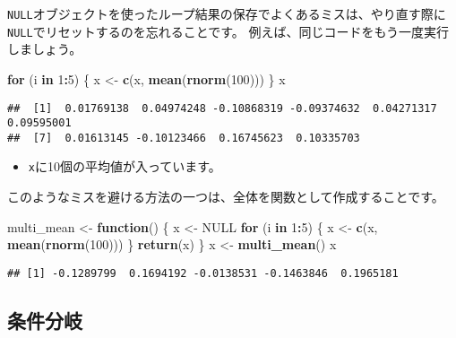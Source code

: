 \documentclass[]{bxjsarticle}
\newenvironment{Shaded}{\begin{snugshade}}{\end{snugshade}}
\newcommand{\ControlFlowTok}[1]{\textcolor[rgb]{0.13,0.29,0.53}{\textbf{#1}}}
\newcommand{\DecValTok}[1]{\textcolor[rgb]{0.00,0.00,0.81}{#1}}
\newcommand{\KeywordTok}[1]{\textcolor[rgb]{0.13,0.29,0.53}{\textbf{#1}}}
\newcommand{\NormalTok}[1]{#1}
\newcommand{\OperatorTok}[1]{\textcolor[rgb]{0.81,0.36,0.00}{\textbf{#1}}}
\newcommand{\OtherTok}[1]{\textcolor[rgb]{0.56,0.35,0.01}{#1}}
\newcommand{\StringTok}[1]{\textcolor[rgb]{0.31,0.60,0.02}{#1}}
\providecommand{\tightlist}{%
  \setlength{\itemsep}{0pt}\setlength{\parskip}{0pt}}
\begin{document}
\texttt{NULL}オブジェクトを使ったループ結果の保存でよくあるミスは、やり直す際に\texttt{NULL}でリセットするのを忘れることです。
例えば、同じコードをもう一度実行しましょう。

\begin{Shaded}
\begin{Highlighting}[]
\ControlFlowTok{for}\NormalTok{ (i }\ControlFlowTok{in} \DecValTok{1}\OperatorTok{:}\DecValTok{5}\NormalTok{) \{}
\NormalTok{  x <-}\StringTok{ }\KeywordTok{c}\NormalTok{(x, }\KeywordTok{mean}\NormalTok{(}\KeywordTok{rnorm}\NormalTok{(}\DecValTok{100}\NormalTok{)))}
\NormalTok{\}}
\NormalTok{x}
\end{Highlighting}
\end{Shaded}

\begin{verbatim}
##  [1]  0.01769138  0.04974248 -0.10868319 -0.09374632  0.04271317  0.09595001
##  [7]  0.01613145 -0.10123466  0.16745623  0.10335703
\end{verbatim}

\begin{itemize}
\tightlist
\item
  \texttt{x}に10個の平均値が入っています。
\end{itemize}

このようなミスを避ける方法の一つは、全体を関数として作成することです。

\begin{Shaded}
\begin{Highlighting}[]
\NormalTok{multi_mean <-}\StringTok{ }\ControlFlowTok{function}\NormalTok{() \{}
\NormalTok{  x <-}\StringTok{ }\OtherTok{NULL}
  \ControlFlowTok{for}\NormalTok{ (i }\ControlFlowTok{in} \DecValTok{1}\OperatorTok{:}\DecValTok{5}\NormalTok{) \{}
\NormalTok{    x <-}\StringTok{ }\KeywordTok{c}\NormalTok{(x, }\KeywordTok{mean}\NormalTok{(}\KeywordTok{rnorm}\NormalTok{(}\DecValTok{100}\NormalTok{)))}
\NormalTok{  \}}
  \KeywordTok{return}\NormalTok{(x)}
\NormalTok{\}}
\NormalTok{x <-}\StringTok{ }\KeywordTok{multi_mean}\NormalTok{()}
\NormalTok{x}
\end{Highlighting}
\end{Shaded}

\begin{verbatim}
## [1] -0.1289799  0.1694192 -0.0138531 -0.1463846  0.1965181
\end{verbatim}

\hypertarget{ux6761ux4ef6ux5206ux5c90}{%
\subsection{条件分岐}\label{ux6761ux4ef6ux5206ux5c90}}
\end{document}
